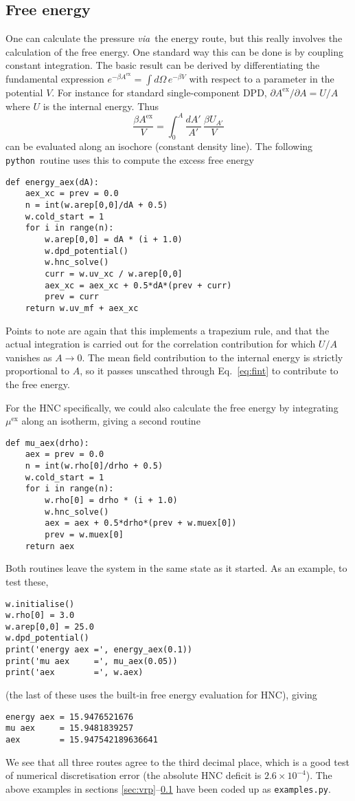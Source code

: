 \documentclass[12pt,a4paper]{article}
\newcommand{\latin}[1]{\emph{#1}}
\newcommand{\via}{\latin{via}}
\newcommand{\myex}{^{\mathrm{ex}}}
\newcommand{\Aex}{A\myex}
\newcommand{\muex}{\mu\myex}
\newcommand{\Eqref}[1]{Eq.~\eqref{#1}}
\newcommand{\python}{{\tt python}}
\begin{document}
\subsection{Free energy}
\label{sec:feng}
%
One can calculate the pressure \via\ the energy route, but this really
involves the calculation of the free energy.  One standard way this
can be done is by coupling constant integration.  The basic result can
be derived by differentiating the fundamental expression
$e^{-\beta\Aex} = \int\!d\Omega\,e^{-\beta V}$ with respect to a
parameter in the potential $V$.  For instance for standard
single-component DPD, ${\partial\Aex}/{\partial A}={U}/{A}$ where $U$
is the internal energy.  Thus
%
\begin{equation}
\frac{\beta \Aex}{V}=\int_0^A\frac{dA'}{A'}\,\frac{\beta U_{A'}}{V}
\label{eq:fint}
\end{equation}
%
can be evaluated along an isochore (constant density line).
The following \python\ routine uses this to compute the excess free
energy
%
\begin{verbatim}
def energy_aex(dA):
    aex_xc = prev = 0.0
    n = int(w.arep[0,0]/dA + 0.5)
    w.cold_start = 1
    for i in range(n):
        w.arep[0,0] = dA * (i + 1.0)
        w.dpd_potential()
        w.hnc_solve()
        curr = w.uv_xc / w.arep[0,0]
        aex_xc = aex_xc + 0.5*dA*(prev + curr)
        prev = curr
    return w.uv_mf + aex_xc
\end{verbatim}
%
Points to note are again that this implements a trapezium rule, and
that the actual integration is carried out for the correlation
contribution for which $U/A$ vanishes as $A\to0$.  The mean field
contribution to the internal energy is strictly proportional to $A$,
so it passes unscathed through \Eqref{eq:fint} to contribute
to the free energy.

For the HNC specifically, we could also calculate the free energy by
integrating $\muex$ along an isotherm, giving a second routine
%
\begin{verbatim}
def mu_aex(drho):
    aex = prev = 0.0
    n = int(w.rho[0]/drho + 0.5)
    w.cold_start = 1
    for i in range(n):
        w.rho[0] = drho * (i + 1.0)
        w.hnc_solve()
        aex = aex + 0.5*drho*(prev + w.muex[0])
        prev = w.muex[0]
    return aex
\end{verbatim}
%
Both routines leave the system in the same state as it started.  As an
example, to test these,
%
\begin{verbatim}
w.initialise()
w.rho[0] = 3.0
w.arep[0,0] = 25.0
w.dpd_potential()
print('energy aex =', energy_aex(0.1))
print('mu aex     =', mu_aex(0.05))
print('aex        =', w.aex)
\end{verbatim}
%
(the last of these uses the built-in free energy evaluation for HNC), giving
%
\begin{verbatim}
energy aex = 15.9476521676
mu aex     = 15.9481839257
aex        = 15.947542189636641
\end{verbatim}
%
We see that all three routes agree to the third decimal place, which
is a good test of numerical discretisation error (the absolute HNC
deficit is $2.6\times10^{-4}$).  The above examples in sections
\ref{sec:vrp}--\ref{sec:feng} have been coded up as
\verb+examples.py+.
\end{document}
